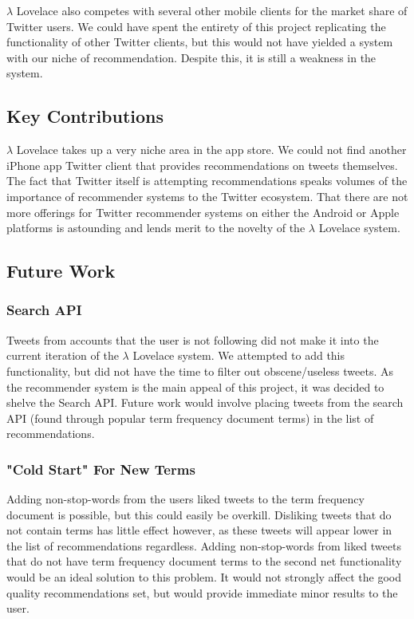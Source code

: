 \documentclass{article}
\begin{document}
$\lambda$ Lovelace also competes with several other mobile clients for the market share of Twitter users. We could have spent the entirety of this project replicating the functionality of other Twitter clients, but this would not have yielded a system with our niche of recommendation. Despite this, it is still a weakness in the system.


\subsection{Key Contributions} %
$\lambda$ Lovelace takes up a very niche area in the app store. We could not find another iPhone app Twitter client that provides recommendations on tweets themselves. The fact that Twitter itself is attempting recommendations speaks volumes of the importance of recommender systems to the Twitter ecosystem. That there are not more offerings for Twitter recommender systems on either the Android or Apple platforms is astounding and lends merit to the novelty of the $\lambda$ Lovelace system.

\subsection{Future Work} %

\subsubsection*{Search API} %
Tweets from accounts that the user is not following did not make it into the current iteration of the $\lambda$ Lovelace system. We attempted to add this functionality, but did not have the time to filter out obscene/useless tweets. As the recommender system is the main appeal of this project, it was decided to shelve the Search API. Future work would involve placing tweets from the search API (found through popular term frequency document terms) in the list of recommendations.

\subsubsection*{"Cold Start" For New Terms} %
Adding non-stop-words from the users liked tweets to the term frequency document is possible, but this could easily be overkill. Disliking tweets that do not contain terms has little effect however, as these tweets will appear lower in the list of recommendations regardless. Adding non-stop-words from liked tweets that do not have term frequency document terms to the second net functionality would be an ideal solution to this problem. It would not strongly affect the good quality recommendations set, but would provide immediate minor results to the user. 
\end{document}
